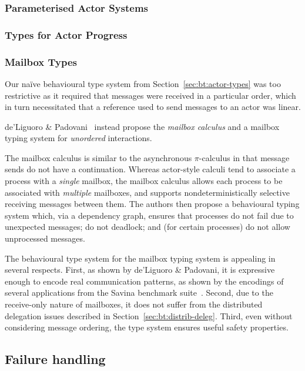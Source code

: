 \documentclass[
graybox,
envcountchap
]{svmult}
\begin{document}
\begin{bibunit}
  \subsubsection{Parameterised Actor Systems}

  \subsubsection{Types for Actor Progress}


  \subsubsection{Mailbox Types}
  Our na\"ive behavioural type system from Section~\ref{sec:bt:actor-types} was too
  restrictive as it required that messages were received in a particular order,
  which in turn necessitated that a reference used to send messages to an actor
  was linear.

  de'Liguoro \& Padovani~\cite{deLiguoroP18:mailbox} instead propose the \emph{mailbox calculus}
  and a mailbox typing system for \emph{unordered} interactions.

  The mailbox calculus is similar to the asynchronous $\pi$-calculus in that
  message sends do not have a continuation. Whereas actor-style calculi tend to
  associate a process with a \emph{single} mailbox, the mailbox calculus allows
  each process to be associated with \emph{multiple} mailboxes, and supports
  nondeterministically selective receiving messages between them.
  The authors then propose a behavioural typing system which, via a
  dependency graph, ensures that processes do not fail due to unexpected
  messages; do not deadlock; and (for certain processes) do not allow
  unprocessed messages.

  The behavioural type system for the mailbox typing system is appealing in
  several respects. First, as shown by de'Liguoro \& Padovani, it is expressive
  enough to encode real communication patterns, as shown by the encodings of
  several applications from the Savina benchmark suite~\cite{ImamS14:savina}. Second, due
  to the receive-only nature of mailboxes, it does not suffer from the
  distributed delegation issues described in Section~\ref{sec:bt:distrib-deleg}.
  Third, even without considering message ordering, the type system ensures
  useful
  safety properties.

  \subsection{Failure handling}\label{sec:bt:failure-handling}


\end{bibunit}
\end{document}
